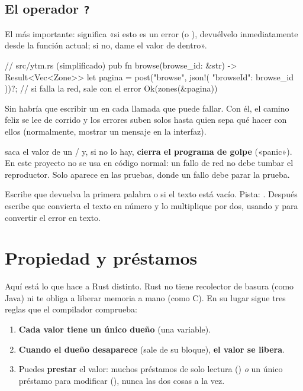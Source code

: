 \subsection{El operador \texttt{?}}

El más importante:  significa «si esto es un error (o ), devuélvelo
inmediatamente desde la función actual; si no, dame el valor de dentro».

\begin{rust}
// src/ytm.rs (simplificado)
pub fn browse(browse_id: &str) -> Result<Vec<Zone>> {
    let pagina = post("browse", json!({ "browseId": browse_id }))?;  // si falla la red, sale con el error
    Ok(zones(&pagina))
}
\end{rust}

Sin  habría que escribir un  en cada llamada que puede fallar. Con él, el
camino feliz se lee de corrido y los errores suben solos hasta quien sepa qué hacer con ellos
(normalmente, mostrar un mensaje en la interfaz).

\begin{trampa}
 saca el valor de un / y, si no lo hay, \textbf{cierra
el programa de golpe} («panic»). En este proyecto no se usa en código normal: un fallo de red
no debe tumbar el reproductor. Solo aparece en las pruebas, donde un fallo debe parar la
prueba.
\end{trampa}

\begin{ejercicio}
Escribe  que devuelva la primera palabra o
 si el texto está vacío. Pista: . Después
escribe  que convierta el texto en número y
lo multiplique por dos, usando  y  para convertir el error en texto.
\end{ejercicio}

\section{Propiedad y préstamos}
\label{sec:propiedad}

Aquí está lo que hace a Rust distinto. Rust no tiene recolector de basura (como Java) ni te
obliga a liberar memoria a mano (como C). En su lugar sigue tres reglas que el compilador
comprueba:

\begin{enumerate}
  \item \textbf{Cada valor tiene un único dueño} (una variable).
  \item \textbf{Cuando el dueño desaparece} (sale de su bloque), \textbf{el valor se libera}.
  \item Puedes \textbf{prestar} el valor: muchos préstamos de solo lectura (\cod{&}) \emph{o}
  un único préstamo para modificar (), nunca las dos cosas a la vez.
\end{enumerate}

